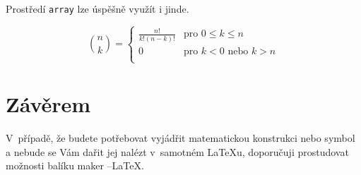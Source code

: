 \documentclass[a4paper, 11pt]{article}
\theoremstyle{definition}
\begin{document}
\begin{twocolumn}
Prostředí \verb|array| lze úspěšně využít i jinde.

$$
\binom{n}{k} = \left\{ 
\begin{array}{ll} 
\frac{n!}{k!(n-k)!}&\text{pro $0 \le k \le n$} \\ 
0&\text{pro $k < 0$ nebo $k > n$}\\  
\end{array} \right. 
$$

\section{Závěrem}
V~případě, že budete potřebovat vyjádřit matematickou konstrukci nebo symbol a nebude se Vám dařit jej nalézt v~samotném \LaTeX{u}, doporučuji prostudovat možnosti balíku maker \AmS--\LaTeX.

\end{twocolumn}
\end{document}
